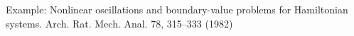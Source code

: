 Example:
Nonlinear oscillations and boundary-value problems for
Hamiltonian systems.
Arch. Rat. Mech. Anal. 78, 315--333 (1982)
